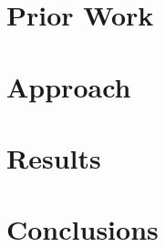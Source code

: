 \documentclass[letterpaper, 10 pt, conference]{ieeeconf}
\begin{document}
\section{Prior Work}
  \label{section:sota}
  

\section{Approach}
  \label{section:the_proposed_method}
  

\section{Results}
  \label{section:results}
  

\section{Conclusions}
  \label{section:finale}
  

\newpage
\begin{thebibliography}{99}
  
\end{thebibliography}


\balance
\end{document}
